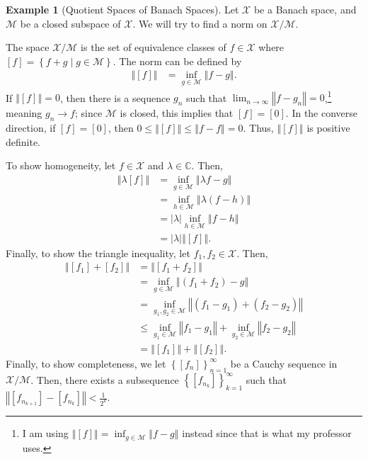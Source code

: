 \documentclass[10pt]{extarticle}
\newcommand{\C}{\mathbb{C}}
\newcommand{\norm}[1]{\left\Vert #1\right\Vert}
\newcommand{\set}[1]{\left\{#1\right\}}
\theoremstyle{plain}
\theoremstyle{definition}
\newtheorem*{example}{Example}
\theoremstyle{note}
\renewcommand{\newline}{\hfill\break}
\begin{document}
\begin{example}[Quotient Spaces of Banach Spaces]
  Let $\mathcal{X}$ be a Banach space, and $\mathcal{M}$ be a closed subspace of $\mathcal{X}$. We will try to find a norm on $\mathcal{X}/\mathcal{M}$.\newline

  The space $\mathcal{X}/\mathcal{M}$ is the set of equivalence classes of $f\in \mathcal{X}$ where $[f] = \set{f + g\mid g\in \mathcal{M}}$. The norm can be defined by
  \begin{align*}
    \norm{[f]} &= \inf_{g\in \mathcal{M}}\norm{f-g}.
  \end{align*}
  If $\norm{[f]} = 0$, then there is a sequence $g_n$ such that $\lim_{n\rightarrow\infty}\norm{f - g_n} = 0$,\footnote{I am using $\norm{[f]} = \inf_{g\in \mathcal{M}}\norm{f-g}$ instead since that is what my professor uses.} meaning $g_n \rightarrow f$; since $\mathcal{M}$ is closed, this implies that $[f] = [0]$. In the converse direction, if $[f] = [0]$, then $0\leq \norm{[f]} \leq \norm{f-f} = 0$. Thus, $\norm{[f]}$ is positive definite.\newline

  To show homogeneity, let $f\in \mathcal{X}$ and $\lambda \in \C$. Then,
  \begin{align*}
    \norm{\lambda[f]} &= \inf_{g\in \mathcal{M}}\norm{\lambda f - g}\\
                      &= \inf_{h\in \mathcal{M}}\norm{\lambda\left(f - h\right)}\\
                      &= |\lambda|\inf_{h\in \mathcal{M}}\norm{f - h}\\
                      &= |\lambda|\norm{[f]}.
  \end{align*}
  Finally, to show the triangle inequality, let $f_1,f_2\in \mathcal{X}$. Then,
  \begin{align*}
    \norm{[f_1] + [f_2]} &= \norm{[f_1 + f_2]}\\
                         &= \inf_{g\in \mathcal{M}}\norm{\left(f_1 + f_2\right) - g}\\
                         &= \inf_{g_1,g_2\in \mathcal{M}}\norm{(f_1 - g_1) + (f_2 - g_2)}\\
                         &\leq \inf_{g_1\in \mathcal{M}}\norm{f_1 - g_1} + \inf_{g_2\in \mathcal{M}}\norm{f_2 - g_2}\\
                         &= \norm{[f_1]} + \norm{[f_2]}.
  \end{align*}
  Finally, to show completeness, we let $\set{[f_n]}_{n=1}^{\infty}$ be a Cauchy sequence in $\mathcal{X}/\mathcal{M}$. Then, there exists a subsequence $\set{\left[f_{n_k}\right]}_{k=1}^{\infty}$ such that $\norm{\left[f_{n_{k+1}}\right] - \left[f_{n_k}\right]} < \frac{1}{2^k}$.\newline


\end{example}
\end{document}
